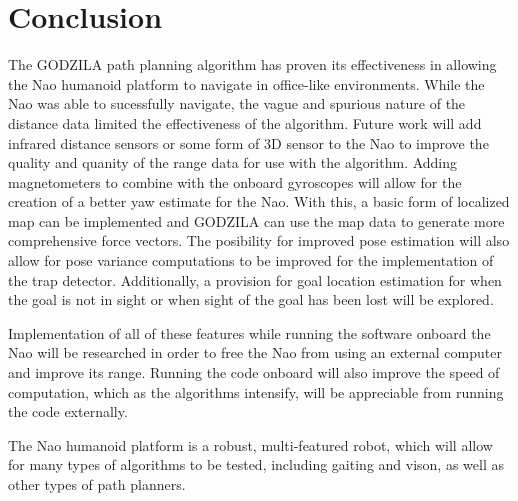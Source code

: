 \chapter{Conclusion}

The GODZILA path planning algorithm has proven its effectiveness in allowing the Nao humanoid platform to navigate in office-like environments. While the Nao was able to sucessfully navigate, the vague and spurious nature of the distance data limited the effectiveness of the algorithm. Future work will add infrared distance sensors or some form of 3D sensor to the Nao to improve the quality and quanity of the range data for use with the algorithm. 
Adding magnetometers to combine with the onboard gyroscopes will allow for the creation of a better yaw estimate for the Nao. With this, a basic form of localized map can be implemented and GODZILA can use the map data to generate more comprehensive force vectors.
The posibility for improved pose estimation will also allow for pose variance computations to be improved for the implementation of the trap detector. Additionally, a provision for goal location estimation for when the goal is not in sight or when sight of the goal has been lost will be explored.

Implementation of all of these features while running the software onboard the Nao will be researched in order to free the Nao from using an external computer and improve its range. Running the code onboard will also improve the speed of computation, which as the algorithms intensify, will be appreciable from running the code externally.

The Nao humanoid platform is a robust, multi-featured robot, which will allow for many types of algorithms to be tested, including gaiting and vison, as well as other types of path planners.